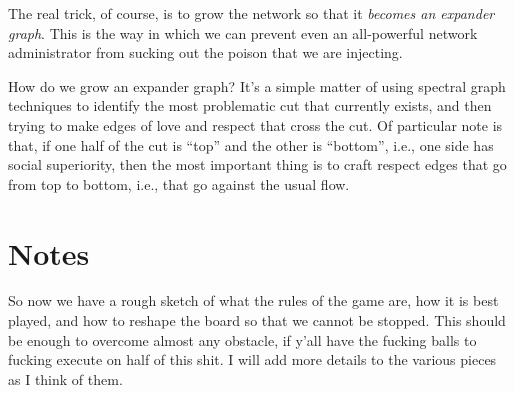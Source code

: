 \documentclass{article}
\begin{document}
The real trick, of course, is to grow the network so that it {\em
  becomes an expander graph}. This is the way in which we can prevent
even an all-powerful network administrator from sucking out the poison
that we are injecting.

How do we grow an expander graph? It's a simple matter of using
spectral graph techniques to identify the most problematic cut that
currently exists, and then trying to make edges of love and respect
that cross the cut. Of particular note is that, if one half of the cut
is ``top'' and the other is ``bottom'', i.e., one side has social
superiority, then the most important thing is to craft respect edges
that go from top to bottom, i.e., that go against the usual flow.

\section{Notes}

So now we have a rough sketch of what the rules of the game are, how
it is best played, and how to reshape the board so that we cannot be
stopped. This should be enough to overcome almost any obstacle, if
y'all have the fucking balls to fucking execute on half of this
shit. I will add more details to the various pieces as I think of
them.

 

\end{document}
